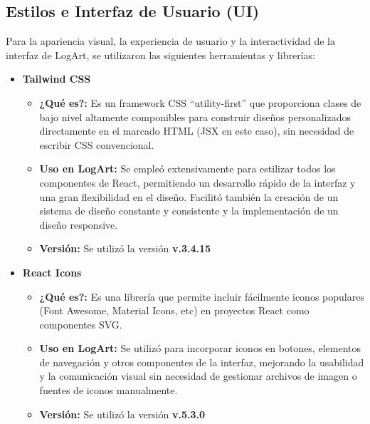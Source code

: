 \subsection{Estilos e Interfaz de Usuario (UI)}
\label{sec:estilosUiFrontend}

Para la apariencia visual, la experiencia de usuario y la interactividad de la interfaz de LogArt, se utilizaron las siguientes herramientas y librerías:

    \begin{itemize}
        \item \textbf{Tailwind CSS}
            \begin{itemize}
                \item \textbf{¿Qué es?:} Es un framework CSS ``utility-first'' que proporciona clases de bajo nivel altamente componibles para construir diseños personalizados directamente en el marcado HTML (JSX en este caso), sin necesidad de escribir CSS convencional. \cite{vabadusTailwindIntro}
                \item \textbf{Uso en LogArt:} Se empleó extensivamente para estilizar todos los componentes de React, permitiendo un desarrollo rápido de la interfaz y una gran flexibilidad en el diseño. Facilitó también la creación de un sistema de diseño constante y consistente y la implementación de un diseño responsive.
                \item \textbf{Versión:} Se utilizó la versión \textbf{v.3.4.15}
            \end{itemize}
        \vspace{0.3cm}
        \item \textbf{React Icons}
            \begin{itemize}
                \item \textbf{¿Qué es?:} Es una librería que permite incluir fácilmente iconos populares (Font Awesome, Material Icons, etc) en proyectos React como componentes SVG.
                \item \textbf{Uso en LogArt:} Se utilizó para incorporar iconos en botones, elementos de navegación y otros componentes de la interfaz, mejorando la usabilidad y la comunicación visual sin necesidad de gestionar archivos de imagen o fuentes de iconos manualmente.
                \item \textbf{Versión:} Se utilizó la versión \textbf{v.5.3.0}
            \end{itemize}
    \end{itemize}

